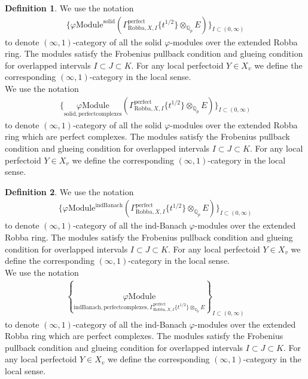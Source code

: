 \documentclass[12pt]{book}
\theoremstyle{definition}
\newtheorem{definition}{Definition}
\begin{document}
\begin{definition}
We use the notation
\begin{align}
\{{\varphi\mathrm{Module}^{\mathrm{solid}}}({\Gamma^\text{perfect}_{\text{Robba},X,I}\{t^{1/2}\}\otimes_{\mathbb{Q}_p}E})\}_{I\subset (0,\infty)}
\end{align}
to denote $(\infty,1)$-category of all the solid $\varphi$-modules over the extended Robba ring. The modules satisfy the Frobenius pullback condition and glueing condition for overlapped intervals $I\subset J\subset K$. For any local perfectoid $Y\in X_v$ we define the corresponding $(\infty,1)$-category in the local sense.\\
We use the notation
\begin{align}
\{\underset{\mathrm{solid,perfectcomplexes}}{\varphi\mathrm{Module}}(\Gamma^\text{perfect}_{\text{Robba},X,I}\{t^{1/2}\}\otimes_{\mathbb{Q}_p}E)\}_{I\subset (0,\infty)}
\end{align}
to denote $(\infty,1)$-category of all the solid $\varphi$-modules over the extended Robba ring which are perfect complexes. The modules satisfy the Frobenius pullback condition and glueing condition for overlapped intervals $I\subset J\subset K$. For any local perfectoid $Y\in X_v$ we define the corresponding $(\infty,1)$-category in the local sense. 

\end{definition}


\begin{definition}
We use the notation
\begin{align}
\{{\varphi\mathrm{Module}}^{\mathrm{indBanach}}(\Gamma^\text{perfect}_{\text{Robba},X,I}\{t^{1/2}\}\otimes_{\mathbb{Q}_p}E)\}_{I\subset (0,\infty)}
\end{align}
to denote $(\infty,1)$-category of all the ind-Banach $\varphi$-modules over the extended Robba ring. The modules satisfy the Frobenius pullback condition and glueing condition for overlapped intervals $I\subset J\subset K$. For any local perfectoid $Y\in X_v$ we define the corresponding $(\infty,1)$-category in the local sense.\\
We use the notation
\begin{align}
\left\{\underset{\mathrm{indBanach,perfectcomplexes},\Gamma^\text{perfect}_{\text{Robba},X,I}\{t^{1/2}\}\otimes_{\mathbb{Q}_p}E}{\varphi\mathrm{Module}}\right\}_{I\subset (0,\infty)}
\end{align}
to denote $(\infty,1)$-category of all the ind-Banach $\varphi$-modules over the extended Robba ring which are perfect complexes. The modules satisfy the Frobenius pullback condition and glueing condition for overlapped intervals $I\subset J\subset K$. For any local perfectoid $Y\in X_v$ we define the corresponding $(\infty,1)$-category in the local sense. 

\end{definition}
\end{document}
